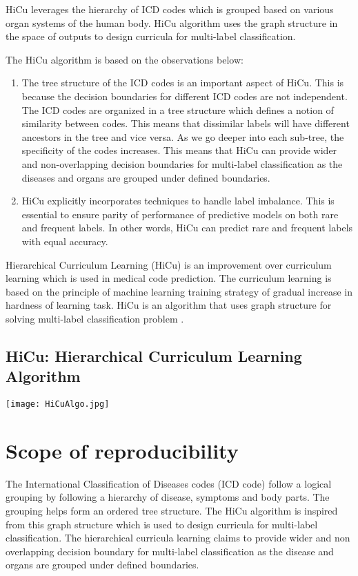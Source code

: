 \documentclass[11pt,a4paper]{article}
\begin{document}
HiCu leverages the hierarchy of ICD codes which is grouped based on various organ systems of the human body. HiCu algorithm uses the graph structure in the space of outputs to design curricula for multi-label classification. 

The HiCu algorithm is based on the observations below:
\begin{enumerate}
\item The tree structure of the ICD codes is an important aspect of HiCu. This is because the decision boundaries for different ICD codes are not independent. The ICD codes are organized in a tree structure which defines a notion of similarity between codes. This means that dissimilar labels will have different ancestors in the tree and vice versa. As we go deeper into each sub-tree, the specificity of the codes increases. This means that HiCu can provide wider and non-overlapping decision boundaries for multi-label classification as the diseases and organs are grouped under defined boundaries.
\item HiCu explicitly incorporates techniques to handle label imbalance. This is essential to ensure parity of performance of predictive models on both rare and frequent labels. In other words, HiCu can predict rare and frequent labels with equal accuracy.
\end{enumerate}

Hierarchical Curriculum Learning (HiCu) is an improvement over curriculum learning \cite{bengio2009curriculum} which is used in medical code prediction. The curriculum learning is based on the principle of machine learning training strategy of gradual increase in hardness of learning task. HiCu is an algorithm that uses graph structure for solving multi-label classification problem \cite{mccallum1999multi}. 

\subsection{HiCu: Hierarchical Curriculum Learning Algorithm}

\texttt{[image: HiCuAlgo.jpg]}

\section{Scope of reproducibility}
The International Classification of Diseases codes (ICD code) follow a logical grouping by following a hierarchy of disease, symptoms and body parts. The grouping helps form an ordered tree structure. The HiCu algorithm is inspired from this graph structure which is used to design curricula for multi-label classification. The hierarchical curricula learning claims to provide wider and non overlapping decision boundary for multi-label classification as the disease and organs are grouped under defined boundaries.
\end{document}

